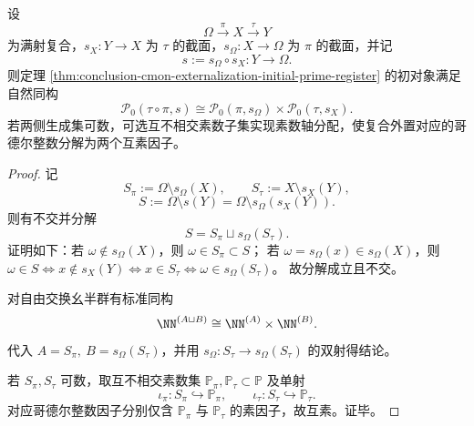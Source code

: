 \begin{corollary}[复合投影的外置链式分解与素数轴可分配性]\label{cor:conclusion-composite-projection-externalization-factorization}
设
\[
\Omega\xrightarrow{\pi}X\xrightarrow{\tau}Y
\]
为满射复合，\(s_X:Y\to X\) 为 \(\tau\) 的截面，\(s_\Omega:X\to\Omega\) 为 \(\pi\) 的截面，并记
\[
s:=s_\Omega\circ s_X:Y\to\Omega.
\]
则定理 \ref{thm:conclusion-cmon-externalization-initial-prime-register} 的初对象满足自然同构
\[
\mathcal P_0(\tau\circ\pi,s)
\cong
\mathcal P_0(\pi,s_\Omega)\times \mathcal P_0(\tau,s_X).
\]
若两侧生成集可数，可选互不相交素数子集实现素数轴分配，使复合外置对应的哥德尔整数分解为两个互素因子。
\end{corollary}
\begin{proof}
记
\[
S_\pi:=\Omega\setminus s_\Omega(X),\qquad
S_\tau:=X\setminus s_X(Y),
\]
\[
S:=\Omega\setminus s(Y)=\Omega\setminus s_\Omega(s_X(Y)).
\]
则有不交并分解
\[
S=S_\pi\sqcup s_\Omega(S_\tau).
\]
证明如下：若 \(\omega\notin s_\Omega(X)\)，则 \(\omega\in S_\pi\subset S\)；
若 \(\omega=s_\Omega(x)\in s_\Omega(X)\)，则 \(\omega\in S\iff x\notin s_X(Y)\iff x\in S_\tau\iff \omega\in s_\Omega(S_\tau)\)。
故分解成立且不交。

对自由交换幺半群有标准同构
\[
\NN^{(A\sqcup B)}\cong \NN^{(A)}\times \NN^{(B)}.
\]
代入 \(A=S_\pi,\ B=s_\Omega(S_\tau)\)，并用 \(s_\Omega:S_\tau\to s_\Omega(S_\tau)\) 的双射得结论。

若 \(S_\pi,S_\tau\) 可数，取互不相交素数集 \(\mathbb P_\pi,\mathbb P_\tau\subset\mathbb P\) 及单射
\[
\iota_\pi:S_\pi\hookrightarrow\mathbb P_\pi,\qquad
\iota_\tau:S_\tau\hookrightarrow\mathbb P_\tau.
\]
对应哥德尔整数因子分别仅含 \(\mathbb P_\pi\) 与 \(\mathbb P_\tau\) 的素因子，故互素。证毕。
\end{proof}



